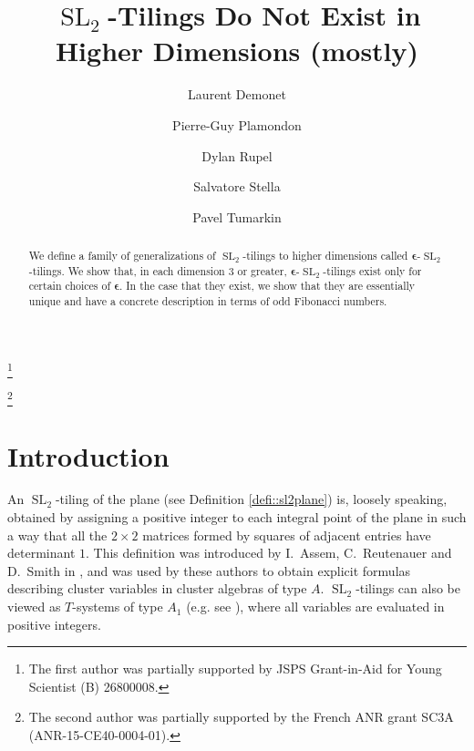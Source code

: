 \documentclass[12pt]{amsart}
\newcommand{\bepsilon}{\boldsymbol{\epsilon}}
\newcommand{\SL}{\operatorname{SL}}
\begin{document}
\title{$\SL_2$-Tilings Do Not Exist in Higher Dimensions (mostly)}

\author[Demonet]{Laurent Demonet}
\address[Laurent Demonet]{Graduate School of Mathematics, Nagoya University, Furocho, Chikusaku, 464-8602 Nagoya, Japan}
\thanks{The first author was partially supported by JSPS Grant-in-Aid for Young Scientist (B) 26800008.}

\author[Plamondon]{Pierre-Guy Plamondon}
\address[Pierre-Guy Plamondon]{Laboratoire de Math\'ematiques d'Orsay, Univ. Paris-Sud, CNRS, Univ.
Paris-Saclay, 91405 Orsay, France.}
\thanks{The second author was partially supported by the French ANR grant SC3A (ANR-15-CE40-0004-01).}

\author[Rupel]{Dylan Rupel}
\address[Dylan Rupel]{Department of Mathematics, University of Notre Dame, Notre Dame, Indiana 46556, USA.}

\author[Stella]{Salvatore Stella}
\address[Salvatore Stella]{IN$d$AM - Marie Curie Actions fellow, Universit\`a ``La Sapienza'', Roma, Italy.}

\author[Tumarkin]{Pavel Tumarkin}
\address[Pavel Tumarkin]{Department of Mathematical Sciences, Durham University, South Road, Durham, DH1 3LE, UK.}

\begin{abstract}
  We define a family of generalizations of $\SL_2$-tilings to higher dimensions called $\bepsilon$-$\SL_2$-tilings.
  We show that, in each dimension 3 or greater, $\bepsilon$-$\SL_2$-tilings exist only for certain choices of $\bepsilon$.
  In the case that they exist, we show that they are essentially unique and have a concrete description in terms of odd Fibonacci numbers.
\end{abstract}

\maketitle

\section{Introduction}
  An $\SL_2$-tiling of the plane (see Definition \ref{defi::sl2plane}) is, loosely speaking, obtained by assigning a positive integer to each integral point of the plane in such a way that all the $2\times 2$ matrices formed by squares of adjacent entries have determinant $1$.
  This definition was introduced by I.~Assem, C.~Reutenauer and D.~Smith in \cite{AssemReutenauerSmith}, and was used by these authors to obtain explicit formulas describing cluster variables in cluster algebras of type $A$.
  $\SL_2$-tilings can also be viewed as $T$-systems of type $A_1$ (e.g. see \cite[Remark 2.1]{DiFrancescoKedem}), where all variables are evaluated in positive integers.
\end{document}
